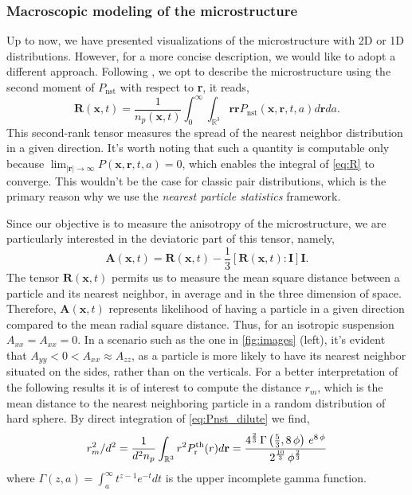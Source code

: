 \subsubsection*{Macroscopic modeling of the microstructure}
Up to now, we have presented visualizations of the microstructure with 2D or 1D distributions. 
However, for a more concise description, we would like to adopt a different approach. 
Following \citet{zhang2023evolution}, we opt to describe the microstructure using the second moment of $P_\text{nst}$ with respect to \textbf{r}, it reads,
\begin{equation}
    \textbf{R}(\textbf{x},t) =\frac{1}{n_p(\textbf{x},t)} 
    \int_0^\infty 
    \int_{\mathbb{R}^3} \textbf{rr} P_\text{nst}(\textbf{x},\textbf{r},t,a) d\textbf{r} da.
    \label{eq:R}
\end{equation}
This second-rank tensor measures the spread of the nearest neighbor distribution in a given direction. 
It's worth noting that such a quantity is computable only because $\lim_{|\textbf{r}|\to \infty} P(\textbf{x},\textbf{r},t,a) = 0$, which enables the integral of \ref{eq:R} to converge. 
This wouldn't be the case for classic pair distributions, which is the primary reason why we use the \textit{nearest particle statistics} framework. 

Since our objective is to measure the anisotropy of the microstructure, we are particularly interested in the deviatoric part of this tensor, namely,
\begin{equation*}
    \textbf{A}(\textbf{x},t) = \textbf{R}(\textbf{x},t) - \frac{1}{3} [\textbf{R}(\textbf{x},t) : \textbf{I}] \textbf{I}.
\end{equation*}
The tensor $\textbf{R}(\textbf{x},t)$ permits us to measure the mean square distance between a particle and its nearest neighbor, in average and in the three dimension of space. 
Therefore, $\textbf{A}(\textbf{x},t)$ represents likelihood of having a particle in a given direction compared to the mean radial square distance. 
Thus, for an isotropic suspension $A_{xx} = A_{xx} = 0$. 
In a scenario such as the one in \ref{fig:images} (left), it's evident that $A_{yy} < 0 < A_{xx} \approx A_{zz}$, as a particle is more likely to have its nearest neighbor situated on the sides, rather than on the verticals.
For a better interpretation of the following results it is of interest to compute the distance $r_m$, which is the mean distance to the nearest neighboring particle in a random distribution of hard sphere. 
By direct integration of \ref{eq:Pnst_dilute} we find, 
\begin{equation*}
    r_m^2 /d^2
    = \frac{1}{d^2n_p} 
    \int_{\mathbb{R}^3} r^2 P_\text{r}^\text{th}(r) d\textbf{r} 
    = {{4^{{{2}\over{3}}}\,\Gamma\left({{5}\over{3}} , 8\,\phi\right)
    \,e^{8\,\phi}}\over{2^{{{10}\over{3}}}\,\phi^{{{2}\over{3}}}}}
\end{equation*}
where $\Gamma(z,a) = \int_a^\infty t^{z-1} e^{-t} dt$ is the upper incomplete gamma function. 

